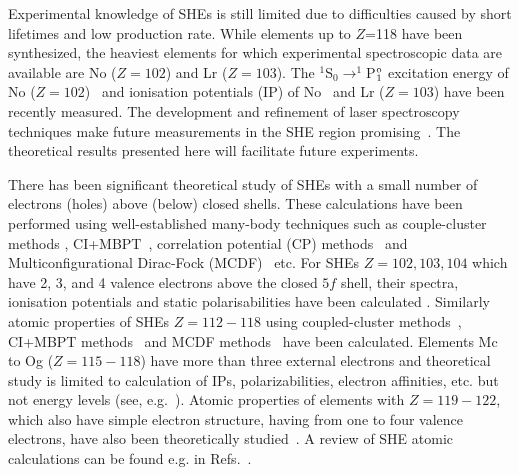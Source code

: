 \documentclass[8pt,a4paper, twoside]{report}
\begin{document}
Experimental knowledge of SHEs is still limited due to difficulties caused by  short lifetimes and low production rate.
While elements up to $Z$=118 have been synthesized, the heaviest elements for which experimental spectroscopic data 
are available are No ($Z=102$) and Lr  ($Z=103$).
The $^1$S$_0 \rightarrow ^1$P$^{\rm o}_1$ excitation energy of No  ($Z=102$)~\cite{Laatiaoui2016} 
and ionisation potentials (IP) of No~\cite{Laatiaoui2016} and Lr ($Z=103$) \cite{SAB15} have been recently measured. 
The development and refinement of laser spectroscopy techniques make future measurements in 
the SHE region promising~\cite{Laatiaoui2014, Laatiaoui20161, Ferrer2017}. 
The theoretical results presented here will facilitate future experiments. 

There has been significant theoretical study of SHEs with a small number of electrons (holes) above (below) closed shells. 
These calculations have been performed using well-established many-body techniques such  as couple-cluster methods \cite{Lindgren1986,Blundell1991}, CI+MBPT~\cite{Dzuba1996}, correlation potential (CP) methods~\cite{Dzuba1989} and Multiconfigurational Dirac-Fock (MCDF)~\cite{Grant1988} etc.  For SHEs $Z=102,103,104$ which have 2, 3, and 4 valence electrons above the  closed $5f$ shell, their spectra, ionisation potentials and static polarisabilities have been calculated \cite{Liu2007,Desclaux1980,Eliav1995,Fritzsche2007,Zou2002,Borschevsky2007,Martin1996,Mosyagin2010, DSS2014, Eliav2015, Kaldor2007}. Similarly atomic properties of SHEs  $Z=112-118$ using  coupled-cluster methods~\cite{DF2016, Pershina2008, Nash2005,Landau2001,Borschevsky2015, Thierfelder2008,Kaldor2008,Dinh2016,Indelicato2007}, CI+MBPT methods~\cite{Dinh2008, Dzuba1996} and MCDF methods~\cite{Eliav1996, Yu2008} have been calculated. 
Elements Mc to Og ($Z=115-118$) have more than three external electrons and theoretical study is limited to
calculation of IPs, polarizabilities, electron affinities, etc. but not energy levels (see, e.g.~\cite{Borschevsky2015}).
Atomic properties of elements with $Z=119-122$, which also have simple electron structure, having from one to four valence
electrons,  have also been theoretically studied~\cite{Landau2001a, Lim2005, Dinh120_2008, Dinh2008a, Gaigalas2010, Borschevsky2013, Skripnikov2013, Dzuba2013, Ginges2015, Eliav2015}. A review of SHE atomic calculations can be found  e.g. in 
Refs.~\cite{Eliav2015,Schwerdtfeger2014}.
 
\end{document}
